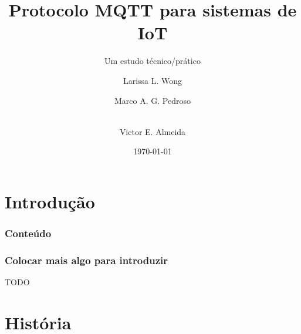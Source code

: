 \documentclass[12pt]{beamer}
\author[Grupo: MQTT]{Larissa L. Wong \and Marco A. G. Pedroso \and\\Victor E. Almeida}
\title{Protocolo MQTT para sistemas de IoT}
\subtitle{Um estudo técnico/prático}
\date{\today}
\institute{UNIOESTE}
\begin{document}
\frame{\titlepage}

\section{Introdução}\label{Introdução}

\begin{frame}
\frametitle{Conteúdo}
\tableofcontents
\end{frame}

\begin{frame}
    \frametitle{Colocar mais algo para introduzir}
    TODO
\end{frame}

\section{História}\label{História}
\end{document}
